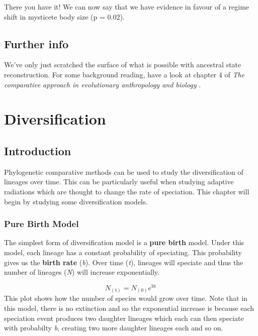 \documentclass[
]{book}
\begin{document}
There you have it! We can now say that we have evidence in favour of a regime shift in mysticete body size (p = 0.02).

\hypertarget{further-info-4}{%
\section{Further info}\label{further-info-4}}

We've only just scratched the surface of what is possible with ancestral state reconstruction. For some background reading, have a look at chapter 4 of \emph{The comparative approach in evolutionary anthropology and biology} \citep{Nunn11}.

\hypertarget{diversification}{%
\chapter{Diversification}\label{diversification}}

\hypertarget{introduction}{%
\section{Introduction}\label{introduction}}

Phylogenetic comparative methods can be used to study the diversification of lineages over time. This can be particularly useful when studying adaptive radiations which are thought to change the rate of speciation. This chapter will begin by studying some diversification models.

\hypertarget{pure-birth-model}{%
\subsection{Pure Birth Model}\label{pure-birth-model}}

The simplest form of diversification model is a \textbf{pure birth} model. Under this model, each lineage has a constant probability of speciating. This probability gives us the \textbf{birth rate} (\emph{b}). Over time (\emph{t}), lineages will speciate and thus the number of lineages (\emph{N}) will increase exponentially.

\[ N_{(\text{t})} = N_{(0)}e^{\text{bt}} \]
This plot shows how the number of species would grow over time. Note that in this model, there is no extinction and so the exponential increase is because each speciation event produces two daughter lineages which each can then speciate with probabilty \emph{b}, creating two more daughter lineages each and so on.
\end{document}
